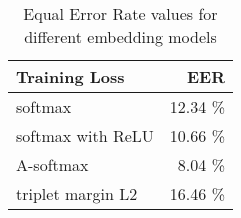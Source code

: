 \begin{table}[h]
    \centering
    \begin{tabular}{|l|r|}
    \hline
        \textbf{Training Loss} & \textbf{EER} \\ \hline
        softmax & 12.34 \% \\ \hline
        softmax with ReLU & 10.66 \% \\ \hline
        A-softmax & 8.04 \% \\ \hline
        triplet margin L2 & 16.46 \% \\ \hline
    \end{tabular}
    \caption{Equal Error Rate values for different embedding models}
    \label{tab:eer}
\end{table}
